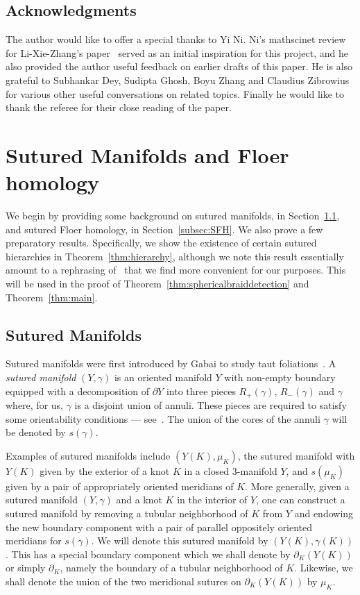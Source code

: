 \documentclass{amsart}
\theoremstyle{definition}
\theoremstyle{remark}
\numberwithin{equation}{section}
\begin{document}
\subsection*{Acknowledgments}  The author would like to offer a special thanks to Yi Ni. Ni's mathscinet review for Li-Xie-Zhang's paper~\cite{li2022floer} served as an initial inspiration for this project, and he also provided the author useful feedback on earlier drafts of this paper. He is also grateful to Subhankar Dey, Sudipta Ghosh, Boyu Zhang and Claudius Zibrowius for various other useful conversations on related topics. Finally he would like to thank the referee for their close reading of the paper.


\section{Sutured Manifolds and Floer homology}\label{sec:review}
We begin by providing some background on sutured manifolds, in Section~\ref{subsec:suturedmnflds}, and sutured Floer homology, in Section~\ref{subsec:SFH}. We also prove a few preparatory results. Specifically, we show the existence of certain sutured hierarchies in Theorem~\ref{thm:hierarchy}, although we note this result essentially amount to a rephrasing of~\cite[Theorem 2.9]{li2022floer} that we find more convenient for our purposes. This will be used in the proof of Theorem~\ref{thm:sphericalbraiddetection} and Theorem~\ref{thm:main}.
\subsection{Sutured Manifolds}\label{subsec:suturedmnflds} Sutured manifolds were first introduced by Gabai to study taut foliations~\cite{gabai1983foliations}. A \emph{sutured manifold} $(Y,\gamma)$ is an oriented manifold $Y$ with non-empty boundary equipped with a decomposition of $\partial Y$ into three pieces $R_+(\gamma)$, $R_-(\gamma)$ and $\gamma$ where, for us, $\gamma$ is a disjoint union of annuli. These pieces are required to satisfy some orientability conditions --- see~\cite[Definition 2.6]{gabai1983foliations}. The union of the cores of the annuli $\gamma$ will be denoted by $s(\gamma)$.


Examples of sutured manifolds include $(Y(K),\mu_K)$, the sutured manifold with $Y(K)$ given by the exterior of a knot $K$ in a closed $3$-manifold $Y$, and $s(\mu_K)$ given by a pair of appropriately oriented meridians of $K$. More generally, given a sutured manifold $(Y,\gamma)$ and a knot $K$ in the interior of $Y$, one can construct a sutured manifold by removing a tubular neighborhood of $K$ from $Y$ and endowing the new boundary component with a pair of parallel oppositely oriented meridians for $s(\gamma)$. We will denote this sutured manifold by $(Y(K),\gamma(K))$. This has a special boundary component which we shall denote by $\partial_K(Y(K))$ or simply $\partial_K$, namely the boundary of a tubular neighborhood of $K$. Likewise, we shall denote the union of the two meridional sutures on $\partial_K(Y(K))$ by $\mu_K$.
\end{document}
